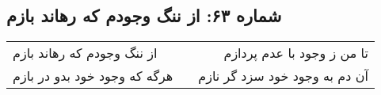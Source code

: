 \begin{center}
\section*{شماره ۶۳: از ننگ وجودم که رهاند بازم}
\label{sec:063}
\begin{longtable}{l p{0.5cm} r}
از ننگ وجودم که رهاند بازم
&&
تا من ز وجود با عدم پردازم
\\
هرگه که وجود خود بدو در بازم
&&
آن دم به وجود خود سزد گر نازم
\\
\end{longtable}
\end{center}
